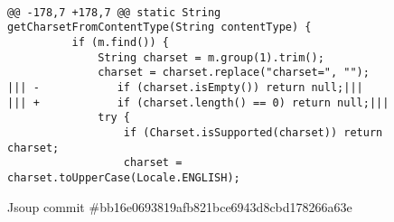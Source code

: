\begin{figure*}
\begin{lstlisting}[moredelim={[is][\color{red}]{|||}{|||}}]

@@ -178,7 +178,7 @@ static String getCharsetFromContentType(String contentType) {
          if (m.find()) {
              String charset = m.group(1).trim();
              charset = charset.replace("charset=", "");
||| -            if (charset.isEmpty()) return null;|||
||| +            if (charset.length() == 0) return null;|||
              try {
                  if (Charset.isSupported(charset)) return charset;
                  charset = charset.toUpperCase(Locale.ENGLISH);
\end{lstlisting}
\caption{Jsoup commit \#bb16e0693819afb821bce6943d8cbd178266a63e\label{fig:backward}}
\end{figure*}